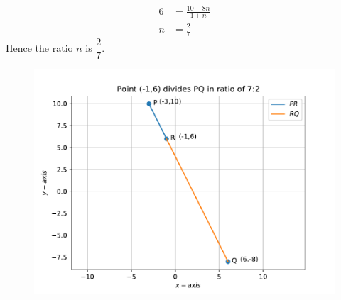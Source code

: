 \documentclass[12pt]{article}
\begin{document}
\begin{enumerate}
\begin{align}
          6 &=\frac{10-8n}{1+n}\\
          n &=\frac{2}{7}
\end{align}
Hence the ratio $n$ is $\dfrac{2}{7}$.
\begin{figure}[!h]
 \begin{center}
  \includegraphics[width=\columnwidth]{figs/fig.pdf}
 \end{center}
\caption{}
\label{fig:Fig1}
\end{figure}
\end{enumerate}
\end{document}
